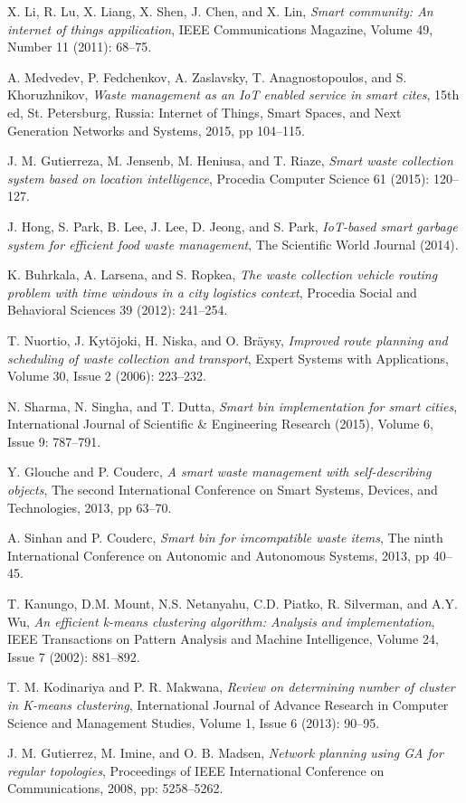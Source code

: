 \documentclass[conference]{IEEEtran}
\begin{document}
\begin{thebibliography}{1}
X. Li, R. Lu, X. Liang, X. Shen, J. Chen, and X. Lin, \emph{Smart community: An internet of things appilication}, IEEE Communications Magazine, Volume 49, Number 11 (2011): 68--75.

A. Medvedev, P. Fedchenkov, A. Zaslavsky, T. Anagnostopoulos, and S. Khoruzhnikov, \emph{Waste management as an IoT enabled service in smart cites}, 15th ed, St. Petersburg, Russia: Internet of Things, Smart Spaces, and Next Generation Networks and Systems, 2015, pp 104--115.



J. M. Gutierreza, M. Jensenb, M. Heniusa, and T. Riaze, \emph{Smart waste collection system based on location intelligence}, Procedia Computer Science 61 (2015): 120--127.


J. Hong, S. Park, B. Lee, J. Lee, D. Jeong, and S. Park, \emph{IoT-based smart garbage system for efficient food waste management}, The Scientific World Journal (2014).




K. Buhrkala, A. Larsena, and S. Ropkea, \emph{The waste collection vehicle routing problem with time windows in a city logistics context}, Procedia Social and Behavioral Sciences 39 (2012): 241--254.


T. Nuortio, J. Kyt\"ojoki, H. Niska, and O. Br\"aysy, \emph{Improved route planning and scheduling of waste collection and transport}, Expert Systems with Applications, Volume 30, Issue 2 (2006): 223--232.


N. Sharma, N. Singha, and T. Dutta, \emph{Smart bin implementation for smart cities}, International Journal of Scientific \& Engineering Research (2015), Volume 6, Issue 9: 787--791.


Y. Glouche and P. Couderc, \emph{A smart waste management with self-describing objects}, The second International Conference on Smart Systems, Devices, and Technologies, 2013, pp 63--70.


A. Sinhan and P. Couderc, \emph{Smart bin for imcompatible waste items}, The ninth International Conference on Autonomic and Autonomous Systems, 2013, pp 40--45.


T. Kanungo, D.M. Mount, N.S. Netanyahu, C.D. Piatko, R. Silverman, and A.Y. Wu, \emph{An efficient k-means clustering algorithm: Analysis and implementation}, IEEE Transactions on Pattern Analysis and Machine Intelligence, Volume 24, Issue 7 (2002): 881--892.


T. M. Kodinariya and P. R. Makwana, \emph{Review on determining number of cluster in K-means clustering}, International Journal of Advance Research in
Computer Science and Management Studies, Volume 1, Issue 6 (2013): 90--95.


J. M. Gutierrez, M. Imine, and O. B. Madsen, \emph{Network planning using GA for regular topologies}, Proceedings of IEEE International Conference on Communications, 2008, pp: 5258--5262.


\end{thebibliography}




\end{document}
